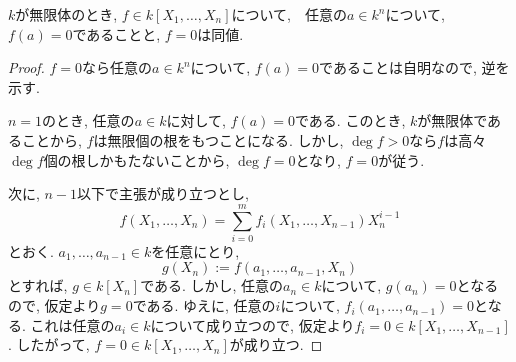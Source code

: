 \documentclass[dvipdfmx]{jsarticle}
\begin{document}
    \begin{lemma}\label{lem: 無限体係数の多項式の零元}
        $k$が無限体のとき, $f \in k[X_1, \dots, X_n]$について,　任意の$a \in k^n$について, $f(a) = 0$であることと, $f = 0$は同値.
    \end{lemma}
    \begin{proof}
        $f = 0$なら任意の$a \in k^n$について, $f(a) = 0$であることは自明なので, 逆を示す.

        $n = 1$のとき, 任意の$a \in k$に対して, $f(a) = 0$である.
        このとき, $k$が無限体であることから, $f$は無限個の根をもつことになる.
        しかし, $\deg{f} > 0$なら$f$は高々$\deg{f}$個の根しかもたないことから,
        $\deg{f} = 0$となり, $f = 0$が従う.

        次に, $n-1$以下で主張が成り立つとし,
        \[
            f(X_1, \dots, X_n) = \sum_{i = 0}^m f_i(X_1, \dots, X_{n-1})X_n^{i-1}
        \]
        とおく.
        $a_1, \dots, a_{n-1} \in k$を任意にとり,
        \[
            g(X_n) := f(a_1, \dots, a_{n-1}, X_n)
        \]
        とすれば, $g \in k[X_n]$である.
        しかし, 任意の$a_n \in k$について, $g(a_n) = 0$となるので,
        仮定より$g = 0$である.
        ゆえに, 任意の$i$について, $f_i(a_1, \dots, a_{n-1}) = 0$となる.
        これは任意の$a_i \in k$について成り立つので, 仮定より$f_i = 0 \in k[X_1, \dots, X_{n-1}]$.
        したがって, $f = 0 \in k[X_1, \dots, X_n]$が成り立つ.
    \end{proof}
\end{document}
